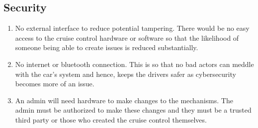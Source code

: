 \documentclass[preprint,11pt,3p]{article}
\begin{document}
\subsection{Security}
\begin{enumerate}
	\item No external interface to reduce potential tampering. There would be no easy access to the cruise control hardware or software so that the likelihood of someone being able to create issues is reduced substantially. 
	\item No internet or bluetooth connection. This is so that no bad actors can meddle with the car's system and hence, keeps the drivers safer as cybersecurity becomes more of an issue.
	\item An admin will need hardware to make changes to the mechanisms. The admin must be authorized to make these changes and they must be a trusted third party or those who created the cruise control themselves. 
\end{enumerate}


	
\end{document}
